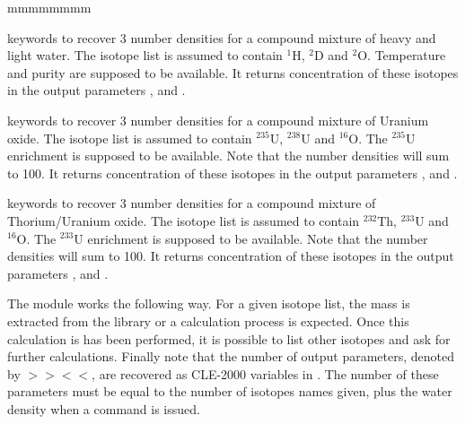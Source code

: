 \begin{ListeDeDescription}{mmmmmmmm}
\item[\moc{WGT\%} \moc{D2O}] keywords to recover 3 number densities for a compound
mixture of heavy and light water. The isotope list is assumed to contain $^{1}$H,
$^{2}$D and $^{2}$O. Temperature and purity are supposed to be available. It returns
concentration of these isotopes in the output parameters ,  and
.

\item[\moc{WGT\%} \moc{UO2}] keywords to recover 3 number densities for a compound
mixture of Uranium oxide. The isotope list is assumed to contain $^{235}$U,
$^{238}$U and $^{16}$O. The $^{235}$U enrichment is supposed to be available. Note
that the number densities will sum to 100. It returns concentration of these
isotopes in the output parameters ,  and .

\item[\moc{WGT\%} \moc{THO2}] keywords to recover 3 number densities for a compound
mixture of Thorium/Uranium oxide. The isotope list is assumed to contain
$^{232}$Th,  $^{233}$U  and $^{16}$O. The $^{233}$U enrichment is supposed to be
available. Note that the number densities will sum to 100. It returns concentration
of these isotopes in the output parameters ,  and .

\end{ListeDeDescription}

The  module works the following way. For a given isotope list, the mass is
extracted from the library or a calculation process is expected. Once this
calculation is has been performed, it is possible to list other isotopes and ask for
further calculations. Finally note that the number of output parameters, denoted by
$>>$$<<$, are recovered as CLE-2000 variables in . The number
of these parameters must be equal to the number of isotopes
names given, plus the water density when a command   
is issued.

\eject
